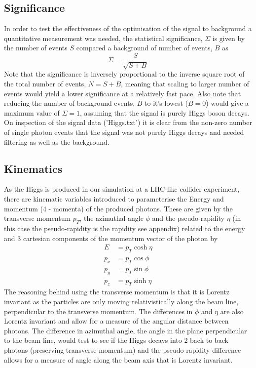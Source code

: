 \documentclass{article}
\begin{document}
\subsection{Significance}
In order to test the effectiveness of the optimisation of the signal to background a quantitative measurement was needed, the statistical significance, $\Sigma$ is given by the number of events $S$ compared a background of number of events, $B$ as
\begin{equation}
\Sigma = \frac{S}{\sqrt{S + B}} 
\end{equation}
Note that the significance is inversely proportional to the inverse square root of the total number of events, $N = S + B$, meaning that scaling to larger number of events would yield a lower significance at a relatively fast pace. Also note that reducing the number of background events, $B$ to it's lowest ($B = 0$) would give a maximum value of $\Sigma = 1$, assuming that the signal is purely Higgs boson decays. On inspection of the signal data ('Higgs.txt') it is clear from the non-zero number of single photon events that the signal was not purely Higgs decays and needed filtering as well as the background. 
\subsection{Kinematics}
As the Higgs is produced in our simulation at a LHC-like collider experiment, there are kinematic variables introduced to parameterise the Energy and momentum (4 - momenta) of the produced photons. These are given by the transverse momentum $p_T$, the azimuthal angle $\phi$ and the pseudo-rapidity $\eta$ (in this case the pseudo-rapidity is the rapidity see appendix) related to the energy and 3 cartesian components of the momentum vector of the photon by
\begin{align}
E &= p_T \cosh {\eta} \\
p_x &= p_T \cos{\phi} \\
p_y &= p_T \sin{\phi} \\
p_z &= p_T \sinh{\eta}
\end{align}
The reasoning behind using the transverse momentum is that it is Lorentz invariant as the particles are only moving relativistically along the beam line, perpendicular to the transverse momentum. The differences in $\phi$ and $\eta$ are also Lorentz invariant and allow for a measure of the angular distance between photons. The difference in azimuthal angle, the angle in the plane perpendicular to the beam line, would test to see if the Higgs decays into 2 back to back photons (preserving transverse momentum) and the pseudo-rapidity difference allows for a measure of angle along the beam axis that is Lorentz invariant.
\end{document}
